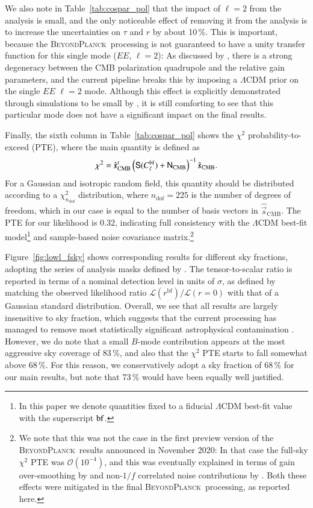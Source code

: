 \documentclass[twocolumn]{aa}
\newcommand{\s}[0]{\vec{s}}
\newcommand{\N}[0]{\tens{N}}
\renewcommand{\S}[0]{\tens{S}}
\newcommand{\BP}{\textsc{BeyondPlanck}}
\begin{document}
We also note in Table~\ref{tab:cospar_pol} that the impact of $\ell=2$
from the analysis is small, and the only noticeable effect of removing
it from the analysis is to increase the uncertainties on $\tau$ and
$r$ by about 10\,\%. This is important, because the \BP\ processing is
not guaranteed to have a unity transfer function for this single mode
($EE$, $\ell=2$): As discussed by \citet{bp07}, there is a strong
degeneracy between the CMB polarization quadrupole and the relative
gain parameters, and the current pipeline breaks this by imposing a
$\Lambda$CDM prior on the single $EE$ $\ell=2$ mode. Although this
effect is explicitly demonstrated through simulations to be small by
\citet{bp04}, it is still comforting to see that this particular mode
does not have a significant impact on the final results.

Finally, the sixth column in Table~\ref{tab:cospar_pol} shows the $\chi^2$
probability-to-exceed (PTE), where the main quantity is defined as
\begin{equation}
  \chi^2 = \hat{\s}_{\mathrm{CMB}}^t
  \left(\S(C_{\ell}^{\mathrm{bf}})+\N_{\mathrm{CMB}}\right)^{-1}\hat{\s}_{\mathrm{CMB}}.
\end{equation}
For a Gaussian and isotropic random field, this quantity should be
distributed according to a $\chi^2_{n_{\mathrm{dof}}}$ distribution,
where $n_{\mathrm{dof}}=225$ is the number of degrees of freedom,
which in our case is equal to the number of basis vectors in
$\hat{\s}_{\mathrm{CMB}}$. The PTE for our likelihood is 0.32,
indicating full consistency with the $\Lambda$CDM best-fit model\footnote{
In this paper we denote quantities fixed to a fiducial $\Lambda$CDM best-fit 
value with the superscript $\rm{bf}$.} 
and sample-based noise covariance matrix.\footnote{We note that this was
  not the case in the first preview version of the \BP\ results
  announced in November 2020: In that case the full-sky $\chi^2$ PTE
  was $\mathcal{O}(10^{-4})$, and this was eventually explained in
  terms of gain over-smoothing by \citet{bp07} and non-$1/f$
  correlated noise contributions by \citet{bp06}. Both these effects
  were mitigated in the final \BP\ processing, as reported here.}

Figure~\ref{fig:lowl_fsky} shows corresponding results for different
sky fractions, adopting the series of analysis masks defined by \citet{planck2016-l05}. The
tensor-to-scalar ratio is reported in terms of a nominal detection
level in units of $\sigma$, as defined by matching the observed
likelihood ratio $\mathcal{L}(r^{\mathrm{bf}})/\mathcal{L}(r=0)$ with
that of a Gaussian standard distribution. Overall, we see that all
results are largely insensitive to sky fraction, which suggests that
the current processing has managed to remove most statistically
significant astrophysical contamination \citep{bp13,bp14}. However, we do
note that a small $B$-mode contribution appears at the most aggressive
sky coverage of 83\,\%, and also that the $\chi^2$ PTE starts to fall
somewhat above 68\,\%. For this reason, we conservatively adopt a sky
fraction of 68\,\% for our main results, but note that 73\,\% would
have been equally well justified. 
\end{document}
